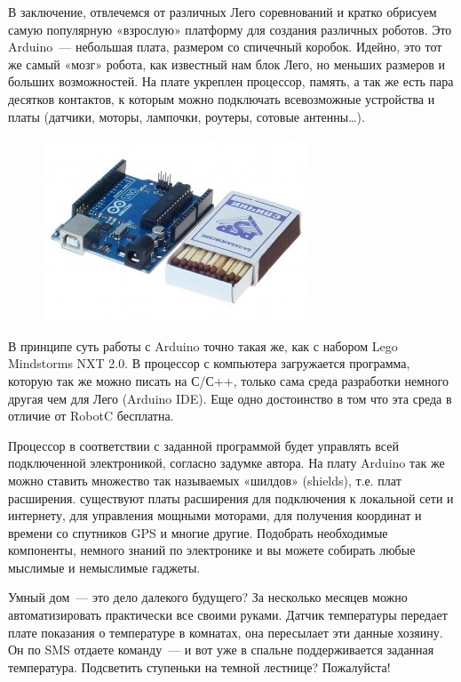 В заключение, отвлечемся от различных Лего соревнований и кратко обрисуем самую популярную «взрослую» платформу для создания различных роботов. Это Arduino~--- небольшая плата, размером со спичечный коробок. Идейно, это тот же самый «мозг» робота, как известный нам блок Лего, но меньших размеров и больших возможностей. На плате укреплен процессор, память, а так же есть пара десятков контактов, к которым можно подключать всевозможные устройства и платы (датчики, моторы, лампочки, роутеры, сотовые антенны\dots).
\clearpage
\begin{figure}[h!]
	\begin{center}
		\includegraphics[width=0.76\linewidth]{chapters/chapter30/images/5}
		\caption{}
		\label{ris:image30x5}
	\end{center}
\end{figure}

В принципе суть работы с  Arduino точно такая же, как с набором Lego Mindstorms NXT 2.0. В процессор с компьютера загружается программа, которую так же можно писать на С/С++, только сама среда разработки немного другая чем для Лего (Arduino IDE). Еще одно достоинство в том что эта среда в отличие от RobotC бесплатна. 

Процессор в соответствии с заданной программой будет управлять всей подключенной электроникой, согласно задумке автора. На плату Arduino так же можно ставить множество так называемых «шилдов» (shields), т.е. плат расширения. существуют платы расширения для подключения к локальной сети и интернету, для управления мощными моторами, для получения координат и времени со спутников GPS  и многие другие. Подобрать необходимые компоненты, немного знаний по электронике и вы можете собирать любые мыслимые и немыслимые гаджеты. 

Умный дом~--- это дело далекого будущего? За несколько месяцев можно автоматизировать практически все своими руками. Датчик температуры передает плате показания о температуре в комнатах, она пересылает эти данные хозяину. Он по SMS отдаете команду~--- и вот уже в спальне поддерживается заданная температура. Подсветить ступеньки на темной лестнице? Пожалуйста!\\
\href{http://arduino-projects.ru/projects/podsvetka-lestnitsyi-s-pomoschyu-arduino/}{}

